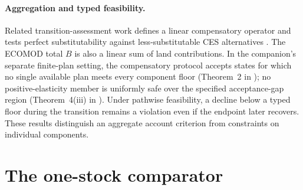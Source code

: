 \documentclass[11pt,a4paper]{article}
\begin{document}
\paragraph{Aggregation and typed feasibility.} Related transition-assessment work defines a linear compensatory operator and tests perfect substitutability against less-substitutable CES alternatives \citep[Sections~2 and 4 of][]{Abaee2026a}. The ECOMOD total $B$ is also a linear sum of land contributions. In the companion's separate finite-plan setting, the compensatory protocol accepts states for which no single available plan meets every component floor (Theorem~2 in \citet{Abaee2026a}); no positive-elasticity member is uniformly safe over the specified acceptance-gap region (Theorem~4(iii) in \citet{Abaee2026a}). Under pathwise feasibility, a decline below a typed floor during the transition remains a violation even if the endpoint later recovers. These results distinguish an aggregate account criterion from constraints on individual components.

\section{The one-stock comparator}\label{si:onestock}
\end{document}
